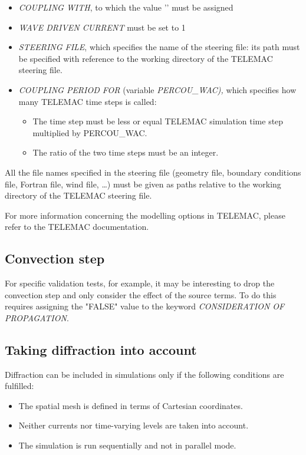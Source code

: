 \begin{itemize}
\item  \textit{COUPLING WITH}, to which the value '\tomawac' must be assigned

\item  \textit{WAVE DRIVEN CURRENT} must be set to 1

\item  \textit{\tomawac STEERING FILE}, which specifies the name of the \tomawac steering file: its path must be specified with reference to the working directory of the TELEMAC steering file.

\item  \textit{COUPLING PERIOD FOR \tomawac} (variable \textit{PERCOU\_WAC),} which specifies how many TELEMAC time steps \tomawac is called:

\begin{itemize}
\item  The \tomawac time step must be less or equal TELEMAC simulation time step multiplied by PERCOU\_WAC.

\item  The ratio of the two time steps must be an integer.
\end{itemize}
\end{itemize}

 All the file names specified in the \tomawac steering file (geometry file, boundary conditions file, Fortran file, wind file, \dots ) must be given as paths relative to the working directory of the TELEMAC steering file.

 For more information concerning the modelling options in TELEMAC, please refer to the TELEMAC documentation.

\subsection{ Convection step}

 For specific validation tests, for example, it may be interesting to drop the convection step and only consider the effect of the source terms. To do this requires assigning the "FALSE" value to the keyword \textit{CONSIDERATION OF PROPAGATION}.


\subsection{ Taking diffraction into account}

 Diffraction can be included in \tomawac simulations only if the following conditions are fulfilled:
\begin{itemize}

\item The spatial mesh is defined in terms of Cartesian coordinates.

 \item Neither currents nor time-varying levels are taken into account.

 \item The simulation is run sequentially and not in parallel mode.
\end{itemize}

